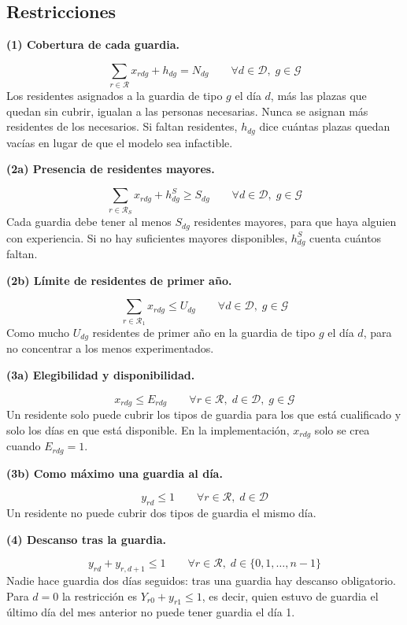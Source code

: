 \subsection{Restricciones}

\newcommand{\restr}[2]{\par\smallskip\noindent\textbf{(#1) #2.}\par\nopagebreak}

\restr{1}{Cobertura de cada guardia}
\[
\sum_{r \in \mathcal{R}} x_{rdg} + h_{dg} = N_{dg} \qquad \forall d \in \mathcal{D},\; g \in \mathcal{G}
\]
Los residentes asignados a la guardia de tipo $g$ el día $d$, más las plazas que quedan sin cubrir, igualan a las personas necesarias. Nunca se asignan más residentes de los necesarios. Si faltan residentes, $h_{dg}$ dice cuántas plazas quedan vacías en lugar de que el modelo sea infactible.

\restr{2a}{Presencia de residentes mayores}
\[
\sum_{r \in \mathcal{R}_S} x_{rdg} + h^{S}_{dg} \ge S_{dg} \qquad \forall d \in \mathcal{D},\; g \in \mathcal{G}
\]
Cada guardia debe tener al menos $S_{dg}$ residentes mayores, para que haya alguien con experiencia. Si no hay suficientes mayores disponibles, $h^{S}_{dg}$ cuenta cuántos faltan.

\restr{2b}{Límite de residentes de primer año}
\[
\sum_{r \in \mathcal{R}_1} x_{rdg} \le U_{dg} \qquad \forall d \in \mathcal{D},\; g \in \mathcal{G}
\]
Como mucho $U_{dg}$ residentes de primer año en la guardia de tipo $g$ el día $d$, para no concentrar a los menos experimentados.

\restr{3a}{Elegibilidad y disponibilidad}
\[
x_{rdg} \le E_{rdg} \qquad \forall r \in \mathcal{R},\; d \in \mathcal{D},\; g \in \mathcal{G}
\]
Un residente solo puede cubrir los tipos de guardia para los que está cualificado y solo los días en que está disponible. En la implementación, $x_{rdg}$ solo se crea cuando $E_{rdg} = 1$.

\restr{3b}{Como máximo una guardia al día}
\[
y_{rd} \le 1 \qquad \forall r \in \mathcal{R},\; d \in \mathcal{D}
\]
Un residente no puede cubrir dos tipos de guardia el mismo día.

\restr{4}{Descanso tras la guardia}
\[
y_{rd} + y_{r,d+1} \le 1 \qquad \forall r \in \mathcal{R},\; d \in \{0, 1, \dots, n-1\}
\]
Nadie hace guardia dos días seguidos: tras una guardia hay descanso obligatorio. Para $d = 0$ la restricción es $Y_{r0} + y_{r1} \le 1$, es decir, quien estuvo de guardia el último día del mes anterior no puede tener guardia el día 1.

